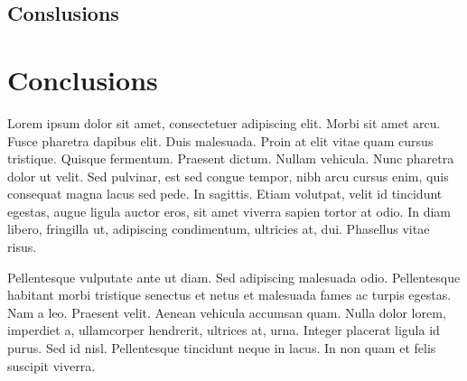 \newpage
{}
{
	\section{Conslusions}
}
{
	\chapter{Conclusions}
}
Lorem ipsum dolor sit amet, consectetuer adipiscing elit. Morbi sit amet arcu. Fusce pharetra dapibus elit. Duis malesuada. Proin at elit vitae quam cursus tristique. Quisque fermentum. Praesent dictum. Nullam vehicula. Nunc pharetra dolor ut velit. Sed pulvinar, est sed congue tempor, nibh arcu cursus enim, quis consequat magna lacus sed pede. In sagittis. Etiam volutpat, velit id tincidunt egestas, augue ligula auctor eros, sit amet viverra sapien tortor at odio. In diam libero, fringilla ut, adipiscing condimentum, ultricies at, dui. Phasellus vitae risus.

Pellentesque vulputate ante ut diam. Sed adipiscing malesuada odio. Pellentesque habitant morbi tristique senectus et netus et malesuada fames ac turpis egestas. Nam a leo. Praesent velit. Aenean vehicula accumsan quam. Nulla dolor lorem, imperdiet a, ullamcorper hendrerit, ultrices at, urna. Integer placerat ligula id purus. Sed id nisl. Pellentesque tincidunt neque in lacus. In non quam et felis suscipit viverra.
